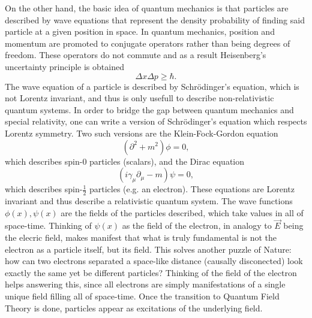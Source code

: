 On the other hand, the basic idea of quantum mechanics is that particles are described by wave equations that represent the density probability of finding said particle at a given position in space. In quantum mechanics, position and momentum are promoted to conjugate operators rather than being degrees of freedom. These operators do not commute and as a result Heisenberg's uncertainty principle is obtained
\begin{equation}
\Delta x\Delta p\geq\hbar.
\end{equation}
The wave equation of a particle is described by Schrödinger's equation, which is not Lorentz invariant, and thus is only usefull to describe non-relativistic quantum systems. In order to bridge the gap between quantum mechanics and special relativity, one can write a version of Schrödinger's equation which respects Lorentz symmetry. Two such versions are the Klein-Fock-Gordon equation
\begin{equation}
\left(\partial^2+m^2\right)\phi=0,
\end{equation}
which describes spin-$0$ particles (scalars), and the Dirac equation
\begin{equation}
\label{ch_intro:eq:Dirac}
\left(i\gamma_{\mu}\partial_{\mu}-m\right)\psi=0,
\end{equation}
which describes spin-$\frac{1}{2}$ particles (e.g. an electron). These equations are Lorentz invariant and thus describe a relativistic quantum system. The wave functions $\phi(x),\psi(x)$ are the fields of the particles described, which take values in all of space-time. Thinking of $\psi(x)$ as the field of the electron, in analogy to $\vec{E}$ being the elecric field, makes manifest that what is truly fundamental is not the electron as a particle itself, but its field. This solves another puzzle of Nature: how can two electrons separated a space-like distance (causally disconected) look exactly the same yet be different particles? Thinking of the field of the electron helps answering this, since all electrons are simply manifestations of a single unique field filling all of space-time. Once the transition to Quantum Field Theory is done, particles appear as excitations of the underlying field.

